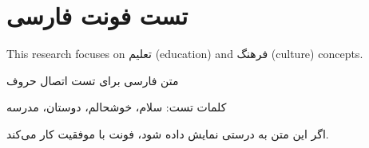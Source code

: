 \documentclass[12pt,a4paper]{article}
\begin{document}
\section*{تست فونت فارسی}

This research focuses on تعلیم (education) and فرهنگ (culture) concepts.

متن فارسی برای تست اتصال حروف

کلمات تست: سلام، خوشحالم، دوستان، مدرسه

اگر این متن به درستی نمایش داده شود، فونت با موفقیت کار می‌کند.
\end{document}

